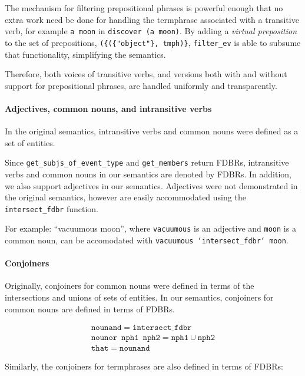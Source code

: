 \documentclass[../main.tex]{subfiles}
\begin{document}
The mechanism for filtering prepositional phrases is powerful enough that no extra work need be done for handling the termphrase associated with a transitive verb, for example
\texttt{a moon} in \texttt{discover (a moon)}.  By adding a {\em
virtual preposition} to the set of prepositions, \texttt{(\{(\{"object"\},
tmph)\}}, \texttt{filter\_ev} is able to subsume that functionality, simplifying
the semantics.

Therefore, both voices of transitive verbs, and versions both with and without support for prepositional phrases, are handled uniformly and transparently.

\paragraph{Adjectives, common nouns, and intransitive verbs}

In the original semantics, intransitive verbs and common nouns were defined as a set of entities.

Since \texttt{get\_subjs\_of\_event\_type} and \texttt{get\_members} return
FDBRs, intransitive verbs and common nouns in our semantics are denoted by FDBRs.
In addition, we also support adjectives in our semantics. 
Adjectives were not demonstrated in the original semantics, however are easily accommodated using the \texttt{intersect\_fdbr} function.

For example: ``vacuumous moon'', where \texttt{vacuumous} is an adjective
and \texttt{moon} is a common noun, can be accomodated with
\texttt{vacuumous `intersect\_fdbr` moon}.


\paragraph{Conjoiners}

Originally, conjoiners for common nouns were defined in terms of the intersections and unions
of sets of entities.  In our semantics, conjoiners for common nouns are defined in terms
of FDBRs.

\begin{gather*}
    \mathtt{nounand} = \mathtt{intersect\_fdbr} \\
    \mathtt{nounor}\enspace \mathtt{nph1}\enspace \mathtt{nph2} = \mathtt{nph1} \cup \mathtt{nph2} \\
    \mathtt{that} = \mathtt{nounand}
\end{gather*}

Similarly, the conjoiners for termphrases are also defined in terms of FDBRs:
\end{document}
